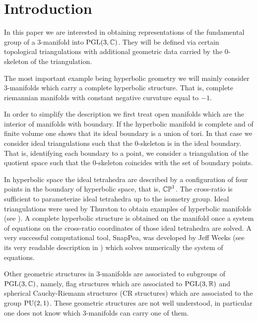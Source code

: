 \section{Introduction}

In this paper we are interested in obtaining representations
of the fundamental group of a 3-manifold  into $\textrm{PGL}(3,\mathbb{C})$.  They will be defined via certain topological triangulations with additional geometric data carried by the
0-skeleton of the triangulation.

The most important example being hyperbolic geometry we will mainly consider 3-manifolds which carry a complete hyperbolic structure.  That is, complete riemannian manifolds with  constant negative curvature equal to $-1$.


 In order to simplify the description we first treat open manifolds
which are the interior of manifolds with boundary.  If the hyperbolic manifold is complete and of finite volume one shows that its ideal boundary is a union of tori.  In that case we consider ideal triangulations such that the 0-skeleton is in the ideal boundary.  That is, identifying each boundary to a point, we consider a triangulation of the quotient space such that the 0-skeleton
coincides with the set of boundary points.

In hyperbolic space the ideal tetrahedra are described by a configuration of four points in the boundary of hyperbolic space, that is, $\mathbb{CP}^1$.  The cross-ratio is sufficient
to parameterize ideal tetrahedra up to the isometry group.  Ideal triangulations were used by Thurston to obtain examples of hyperbolic manifolds (see \cite{Thurston}).  A complete hyperbolic structure
is obtained on the manifold once a system of equations on the cross-ratio coordinates of those ideal tetrahedra are solved.  A very successful computational tool, SnapPea, was developed by Jeff Weeks (see its very readable description in \cite{Weeks}) which solves numerically the system of equations.


Other geometric structures in 3-manifolds are associated to subgroups of $\textrm{PGL}(3,\mathbb{C})$, namely, flag structures which are associated to $\textrm{PGL}(3,\mathbb{R})$ and spherical Cauchy-Riemann structures (CR structures)
which are associated to the group $\textrm{PU}(2,1)$. These geometric structures are not well understood, in particular one does not know which 3-manifolds can carry one of them.

